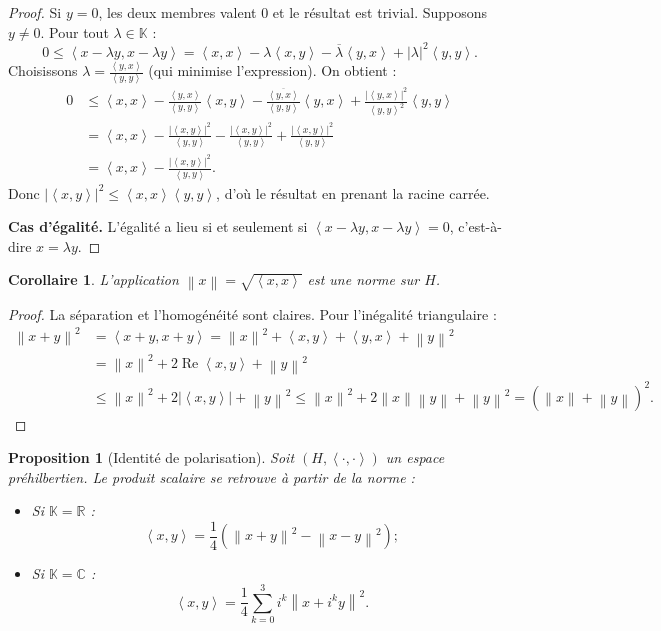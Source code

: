 \documentclass[a4paper,12pt]{book}
\newcommand{\R}{\mathbb{R}}
\newcommand{\C}{\mathbb{C}}
\newcommand{\K}{\mathbb{K}}
\newcommand{\norm}[1]{\left\| #1 \right\|}
\newcommand{\abs}[1]{\left| #1 \right|}
\newcommand{\inner}[2]{\left\langle #1, #2 \right\rangle}
\theoremstyle{definition}
\theoremstyle{plain}
\newtheorem{proposition}[definition]{Proposition}
\newtheorem{corollaire}[definition]{Corollaire}
\theoremstyle{remark}
\begin{document}
\begin{proof}
Si $y = 0$, les deux membres valent $0$ et le résultat est trivial. Supposons $y \neq 0$. Pour tout $\lambda \in \K$ :
\[
    0 \leq \inner{x - \lambda y}{x - \lambda y} = \inner{x}{x} - \lambda\inner{x}{y} - \overline{\lambda}\inner{y}{x} + \abs{\lambda}^2\inner{y}{y}.
\]
Choisissons $\lambda = \frac{\inner{y}{x}}{\inner{y}{y}}$ (qui minimise l'expression). On obtient :
\begin{align*}
    0 &\leq \inner{x}{x} - \frac{\inner{y}{x}}{\inner{y}{y}}\inner{x}{y} - \frac{\overline{\inner{y}{x}}}{\inner{y}{y}}\inner{y}{x} + \frac{\abs{\inner{y}{x}}^2}{\inner{y}{y}^2}\inner{y}{y} \\
    &= \inner{x}{x} - \frac{\abs{\inner{x}{y}}^2}{\inner{y}{y}} - \frac{\abs{\inner{x}{y}}^2}{\inner{y}{y}} + \frac{\abs{\inner{x}{y}}^2}{\inner{y}{y}} \\
    &= \inner{x}{x} - \frac{\abs{\inner{x}{y}}^2}{\inner{y}{y}}.
\end{align*}
Donc $\abs{\inner{x}{y}}^2 \leq \inner{x}{x}\inner{y}{y}$, d'où le résultat en prenant la racine carrée.

\textbf{Cas d'égalité.} L'égalité a lieu si et seulement si $\inner{x - \lambda y}{x - \lambda y} = 0$, c'est-à-dire $x = \lambda y$.
\end{proof}

\begin{corollaire}\label{cor:norme-prehilbert}
L'application $\norm{x} = \sqrt{\inner{x}{x}}$ est une norme sur $H$.
\end{corollaire}

\begin{proof}
La séparation et l'homogénéité sont claires. Pour l'inégalité triangulaire :
\begin{align*}
    \norm{x+y}^2 &= \inner{x+y}{x+y} = \norm{x}^2 + \inner{x}{y} + \inner{y}{x} + \norm{y}^2 \\
    &= \norm{x}^2 + 2\operatorname{Re}\inner{x}{y} + \norm{y}^2 \\
    &\leq \norm{x}^2 + 2\abs{\inner{x}{y}} + \norm{y}^2 \leq \norm{x}^2 + 2\norm{x}\norm{y} + \norm{y}^2 = (\norm{x}+\norm{y})^2.
\end{align*}
\end{proof}

\begin{proposition}[Identité de polarisation]\label{prop:polarisation}
Soit $(H, \inner{\cdot}{\cdot})$ un espace préhilbertien. Le produit scalaire se retrouve à partir de la norme :
\begin{itemize}
    \item Si $\K = \R$ :
    \[
        \inner{x}{y} = \frac{1}{4}\left(\norm{x+y}^2 - \norm{x-y}^2\right) ;
    \]
    \item Si $\K = \C$ :
    \[
        \inner{x}{y} = \frac{1}{4}\sum_{k=0}^{3} i^k \norm{x + i^k y}^2.
    \]
\end{itemize}
\end{proposition}
\end{document}
